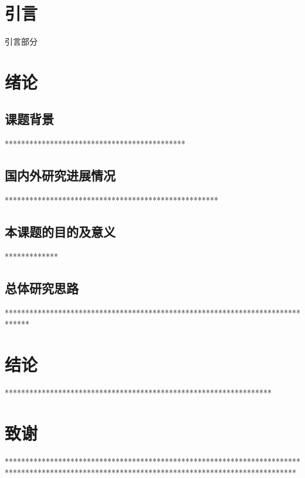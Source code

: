 \documentclass[12pt,a4paper]{article}
\begin{document}
{
\setlength{\baselineskip}{23pt}


\section*{引\quad 言}

引言部分


\newpage
\setcounter{section}{1}
\section{绪论}
\subsection{课题背景}
********************************************
\subsection{国内外研究进展情况}
****************************************************

\subsection{本课题的目的及意义}
*************

\subsection{总体研究思路}

******************************************************************************



\newpage
\section*{结论}
*****************************************************************

\newpage
\section*{致谢}

***********************************************************************************************************************************************
\newpage
{}
}
\end{document}
